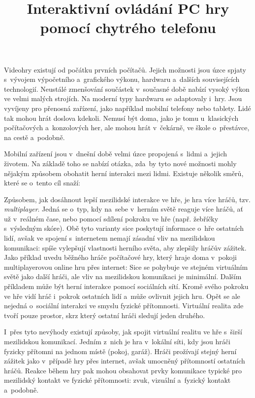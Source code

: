 \documentclass[thesis=B,czech,hidelinks]{FITthesis}[2012/06/26] %
\title{Interaktivn{\' i} ovl{\' a}d{\' a}n{\' i} PC hry pomoc{\' i} chytr{\' e}ho telefonu}
\begin{document}
 

\begin{introduction}
Videohry existují od počátku prvních počítačů. \cite{rylich} Jejich možnosti jsou úzce spjaty s~vývojem výpočetního a~grafického výkonu, hardwaru a~dalších souvisejících technologií. Neustálé zmenšování součástek v~současné době nabízí vysoký výkon ve velmi malých strojích. \cite{kupi} Na moderní typy hardwaru se adaptovaly i~hry. Jsou vyvíjeny pro přenosná zařízení, jako například mobilní telefony nebo tablety. Lidé tak mohou hrát doslova kdekoli. Nemusí být doma, jako je tomu u~klasických počítačových a~konzolových her, ale mohou hrát v~čekárně, ve škole o~přestávce, na cestě a~podobně.

Mobilní zařízení jsou v~dnešní době velmi úzce propojená s~lidmi a~jejich životem. Na základě toho se nabízí otázka, zda~by tyto nové možnosti mohly nějakým způsobem obohatit herní interakci mezi lidmi. Existuje několik směrů, které se o~tento cíl snaží:

Způsobem, jak dosáhnout lepší mezilidské interakce ve hře, je hra více hráčů, tzv. \textit{multiplayer}. Jedná se o~typ, kdy na~sebe v~herním světě reaguje více hráčů, ať už v~reálném čase, nebo pomocí sdílení pokroku ve hře (např. žebříčky s~výsledným skóre). Obě tyto varianty sice poskytují informace o~hře ostatních lidí, avšak ve spojení s~internetem nemají zásadní vliv na mezilidskou komunikaci: spíše vylepšují vlastnosti herního světa, aby zlepšily hráčův zážitek. Jako příklad uvedu běžného hráče počítačové hry, který hraje doma v~pokoji multiplayerovou online hru přes internet: Sice se pohybuje ve stejném virtuálním světě jako další hráči, ale vliv na mezilidskou komunikaci je minimální. Dalším příkladem může být herní interakce pomocí sociálních sítí. Kromě svého pokroku ve hře vidí hráč i~pokrok ostatních lidí a~může ovlivnit jejich hru. Opět se ale nejedná o~sociální interakci ve smyslu fyzické přítomnosti. Virtuální realita zde tvoří pouze prostor, skrz který ostatní hráči sledují jeden druhého.

I~přes tyto nevýhody existují způsoby, jak spojit virtuální realitu ve hře s~širší mezilidskou komunikací. Jedním z~nich je hra v~lokální síti, kdy jsou hráči fyzicky přítomni na jednom místě (pokoj, garáž). Hráči prožívají stejný herní zážitek jako v~případě hry přes internet, avšak umocněný přítomností ostatních hráčů. Reakce během hry pak mohou obsahovat prvky komunikace typické pro mezilidský kontakt ve fyzické přítomnosti: zvuk, vizuální a~fyzický kontakt a~podobně.


\end{introduction}
\end{document}
